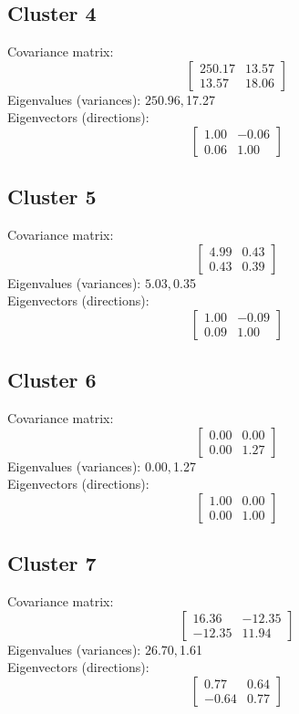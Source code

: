 \documentclass{article}
\begin{document}
\subsection*{Cluster 4}
Covariance matrix:
\[\begin{bmatrix}250.17 & 13.57 \\13.57 & 18.06\end{bmatrix}\]
Eigenvalues (variances): $ 250.96, $17.27\\
Eigenvectors (directions):
\[\begin{bmatrix}1.00 & -0.06 \\0.06 & 1.00\end{bmatrix}\]
\subsection*{Cluster 5}
Covariance matrix:
\[\begin{bmatrix}4.99 & 0.43 \\0.43 & 0.39\end{bmatrix}\]
Eigenvalues (variances): $ 5.03, $0.35\\
Eigenvectors (directions):
\[\begin{bmatrix}1.00 & -0.09 \\0.09 & 1.00\end{bmatrix}\]
\subsection*{Cluster 6}
Covariance matrix:
\[\begin{bmatrix}0.00 & 0.00 \\0.00 & 1.27\end{bmatrix}\]
Eigenvalues (variances): $ 0.00, $1.27\\
Eigenvectors (directions):
\[\begin{bmatrix}1.00 & 0.00 \\0.00 & 1.00\end{bmatrix}\]
\subsection*{Cluster 7}
Covariance matrix:
\[\begin{bmatrix}16.36 & -12.35 \\-12.35 & 11.94\end{bmatrix}\]
Eigenvalues (variances): $ 26.70, $1.61\\
Eigenvectors (directions):
\[\begin{bmatrix}0.77 & 0.64 \\-0.64 & 0.77\end{bmatrix}\]
\end{document}
